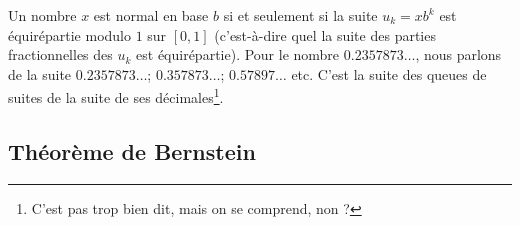 \begin{remark}  \label{RemUXAkcuH}
	Un nombre \( x\) est normal en base \( b\) si et seulement si la suite  \( u_k=xb^k\) est équirépartie modulo \( 1\) sur \( [0,1]\) (c'est-à-dire quel la suite des parties fractionnelles des \( u_k\) est équirépartie). Pour le nombre \( 0.2357873\ldots\), nous parlons de la suite \( 0.2357873\ldots\); \( 0.357873\ldots\); \( 0.57897\ldots\) etc. C'est la suite des queues de suites de la suite de ses décimales\footnote{C'est pas trop bien dit, mais on se comprend, non ?}.
\end{remark}

\subsection{Théorème de Bernstein}

